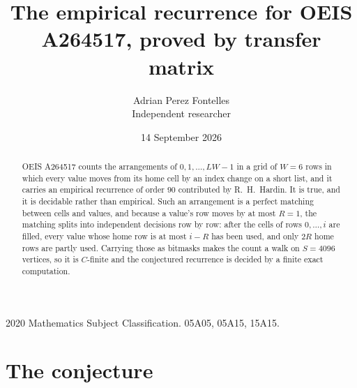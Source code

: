 \documentclass[11pt,a4paper]{article}
\title{The empirical recurrence for OEIS A264517, proved by transfer matrix}
\author{Adrian Perez Fontelles\\ \small Independent researcher}
\date{14 September 2026}
\theoremstyle{plain}
\theoremstyle{definition}
\begin{document}
\maketitle

\begin{abstract}
OEIS A264517 counts the arrangements of $0,1,\dots,LW-1$ in a grid of $W=6$ rows in which
every value moves from its home cell by an index change on a short list, and it carries an
empirical recurrence of order $90$ contributed by R.~H.~Hardin. It is true, and it is
decidable rather than empirical. Such an arrangement is a perfect matching between cells and
values, and because a value's row moves by at most $R=1$, the matching splits into
independent decisions row by row: after the cells of rows $0,\dots,i$ are filled,
every value whose home row is at most $i-R$ has been used, and only $2R$ home rows are
partly used. Carrying those as bitmasks makes the count a walk on $S=4096$ vertices, so it is
$C$-finite and the conjectured recurrence is decided by a finite exact computation.
\end{abstract}

\noindent\small 2020 Mathematics Subject Classification. 05A05, 05A15, 15A15.\normalsize

\section{The conjecture}
\end{document}
